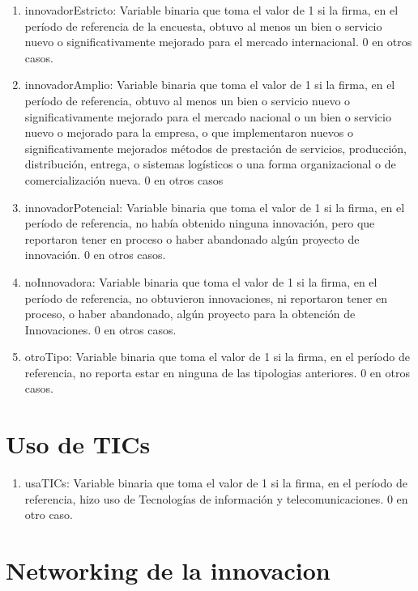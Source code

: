 \documentclass[12pt,a4paper]{article}
\begin{document}
\begin{enumerate}
	\item innovadorEstricto: Variable binaria que toma el valor de 1 si la firma, en el período de referencia de la encuesta, obtuvo al menos un bien o servicio nuevo o significativamente mejorado para el mercado internacional. 0 en otros casos.
	\item innovadorAmplio: Variable binaria que toma el valor de 1 si la firma, en el período de referencia, obtuvo al menos un bien o servicio nuevo o significativamente mejorado para el mercado nacional o un bien o servicio nuevo o mejorado para la empresa, o que implementaron nuevos o significativamente mejorados métodos de prestación de servicios, producción, distribución, entrega, o sistemas logísticos o una forma organizacional o de comercialización nueva. 0 en otros casos
	\item innovadorPotencial: Variable binaria que toma el valor de 1 si la firma, en el período de referencia, no había obtenido ninguna innovación, pero que reportaron tener en proceso o haber abandonado algún proyecto de innovación. 0 en otros casos.
	\item noInnovadora: Variable binaria que toma el valor de 1 si la firma, en el período de referencia, no obtuvieron innovaciones, ni reportaron tener en proceso, o haber abandonado, algún proyecto para la obtención de Innovaciones. 0 en otros casos.
	\item otroTipo: Variable binaria que toma el valor de 1 si la firma, en el período de referencia, no reporta estar en ninguna de las tipologias anteriores. 0 en otros casos.
\end{enumerate}

\section{Uso de TICs}

\begin{enumerate}
	\item usaTICs: Variable binaria que toma el valor de 1 si la firma, en el período de referencia, hizo uso de Tecnologías de información y telecomunicaciones. 0 en otro caso.
\end{enumerate}

\section{Networking de la innovacion}
\end{document}
